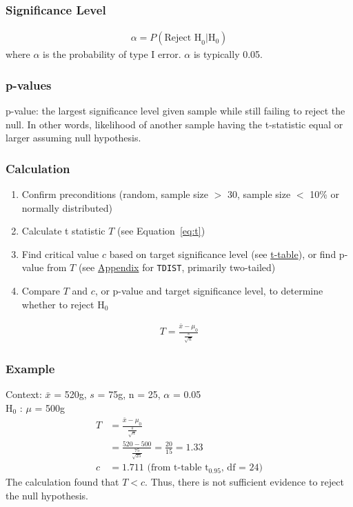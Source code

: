 \documentclass[12pt]{article}
\numberwithin{equation}{section}
\begin{document}
\subsubsection{Significance Level}
\begin{gather}
    \alpha = P(\text{Reject H}_0|\text{H}_0)
\end{gather}
where $\alpha$ is the probability of type I error. $\alpha$ is typically 0.05.

\subsubsection{p-values}
p-value: the largest significance level given sample while still failing to reject the null. In other words, likelihood of another sample having the t-statistic equal or larger assuming null hypothesis.

\subsubsection{Calculation}
\begin{enumerate}
    \item Confirm preconditions (random, sample size $>$ 30, sample size $<$ 10\% or normally distributed)
    \item Calculate t statistic $T$ (see Equation~\ref{eq:t})
    \item Find critical value $c$ based on target significance level (see \href{fig:t_table}{t-table}), or find p-value from $T$ (see \href{sec:appendix}{Appendix} for \verb|TDIST|, primarily two-tailed)
    \item Compare $T$ and $c$, or p-value and target significance level, to determine whether to reject H$_0$
\end{enumerate}
\begin{gather}
    T = \frac{\bar{x}-\mu_0}{\frac{s}{\sqrt{n}}} \label{eq:t}
\end{gather}

\subsubsection{Example}
Context: $\bar{x}$ = 520g, $s$ = 75g, n = 25, $\alpha$ = 0.05 \\
H$_0$ : $\mu$ = 500g
\begin{align}
    T &= \frac{\bar{x}-\mu_0}{\frac{s}{\sqrt{n}}} \\
    &= \frac{520-500}{\frac{75}{\sqrt{25}}} = \frac{20}{15} = 1.33 \\
    c &= 1.711 \text{ (from t-table t$_{0.95}$, df = 24)}
\end{align}
The calculation found that $T<c$. Thus, there is not sufficient evidence to reject the null hypothesis.
\end{document}
